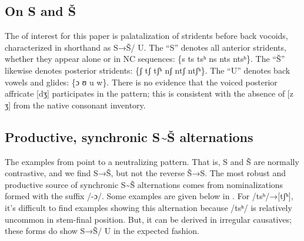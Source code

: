 \documentclass[output=paper,newtxmath,modfonts,nonflat,hidelinks]{langsci/langscibook}
\begin{document}
\subsection{On S and Š}\label{sec:bennett:2.2}

The  of interest for this paper is palatalization of stridents before back vocoids, characterized in shorthand as S→Š/ {\longrule} U. The ``S'' denotes all anterior stridents, whether they appear alone or in NC sequences: \{s ts tsʰ ns nts ntsʰ\}. The ``Š'' likewise denotes posterior stridents: \{ʃ tʃ tʃʰ nʃ ntʃ ntʃʰ\}. The ``U'' denotes back vowels and glides: \{ɔ ʊ u w\}. There is no evidence that the voiced posterior affricate [dʒ] participates in the pattern; this is consistent with the absence of [z ʒ] from the native consonant inventory.

\subsection{Productive, synchronic S{\textasciitilde}Š alternations}\label{sec:bennett:2.3}
\largerpage
The examples from  point to a neutralizing pattern. That is, S and Š are normally contrastive, and we find S→Š, but not the reverse Š→S. The most robust and productive source of synchronic S{\textasciitilde}Š alternations comes from nominalizations formed with the suffix /-ɔ/. Some examples are given below in . For /tsʰ/→[tʃʰ], it’s difficult to find examples showing this alternation because /tsʰ/ is relatively uncommon in stem-final position. But, it can be derived in irregular causatives; these forms do show S→Š/ {\longrule} U in the expected fashion.
\end{document}
